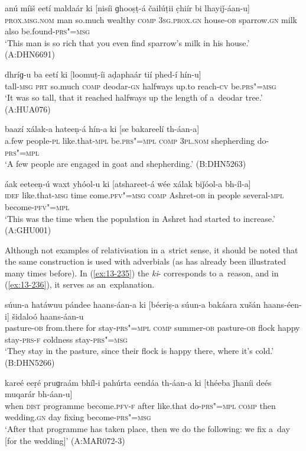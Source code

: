 \begin{exe}
\ex
\label{ex:13-231}
\gll anú míiš eetí maldaár ki [nisíi  ɡhooṣṭ-á čailúṭii c̣hiír bi lhayiǰ-áan-u] \\
\textsc{prox.msg.nom} man so.much wealthy \textsc{comp} \textsc{3sg.prox.gn }  house-\textsc{ob} sparrow.\textsc{gn} milk also be.found-\textsc{prs"=msg} \\
\glt `This man is so rich that you even find sparrow's milk in his house.' (A:DHN6691)

\ex
\label{ex:13-232}
\gll dhríɡ-u ba eetí ki [loomuṭ-íi aḍaphaár  tií phed-í hín-u] \\
tall-\textsc{msg} \textsc{prt} so.much \textsc{comp} deodar-\textsc{gn} halfways up.to reach-\textsc{cv} be.\textsc{prs"=msg} \\
\glt `It was so tall, that it reached halfways up the length of a~deodar tree.' (A:HUA076)

\ex
\label{ex:13-233}
\gll baazí xálak-a hateeṇ-á hín-a ki  [se bakareelí th-áan-a]  \\
a.few people-\textsc{pl}  like.that-\textsc{mpl} be.\textsc{prs"=mpl} \textsc{comp}  \textsc{3pl.nom}  shepherding do-\textsc{prs"=mpl} \\
\glt `A few people are engaged in goat and shepherding.' (B:DHN5263)

\ex
\label{ex:13-234}
\gll áak eeteeṇ-ú waxt yhóol-u ki  [atshareet-á wée xálak biǰóol-a bh-íl-a] \\
\textsc{idef} like.that-\textsc{msg} time come.\textsc{pfv"=msg} \textsc{comp} Ashret-\textsc{ob} in people several-\textsc{mpl} become-\textsc{pfv"=mpl} \\
\glt `This was the time when the population in Ashret had started to increase.' (A:GHU001) 
\end{exe}

Although not examples of relativisation in a~strict sense, it should be noted that the same construction is used with  adverbials (as has already been illustrated many times before). In (\ref{ex:13-235}) the \textit{ki}- corresponds to a~reason, and in (\ref{ex:13-236}), it serves as an~explanation.

\begin{exe}
\ex
\label{ex:13-235}
\gll súun-a hatáwuu pándee haans-áan-a ki  [béeriṣ-a súun-a bakáara
  xušán haans-éen-i]  šidaloó haans-áan-u \\
pasture-\textsc{ob} from.there for stay-\textsc{prs"=mpl} \textsc{comp}  summer-\textsc{ob} pasture-\textsc{ob} flock happy stay-\textsc{prs-f} coldness stay-\textsc{prs"=msg} \\
\glt `They stay in the pasture, since their flock is happy there, where it's cold.' (B:DHN5266)

\ex
\label{ex:13-236}
\gll kareé eeṛé pruɡraám bhíl-i pahúrta eendáa  th-áan-a ki [théeba
  ǰhaníi deés muqarár  bh-áan-u] \\
when \textsc{dist} programme become.\textsc{pfv-f} after like.that  do-\textsc{prs"=mpl} \textsc{comp} then wedding.\textsc{gn} day fixing become-\textsc{prs"=msg} \\
\glt `After that programme has taken place, then we do the following: we fix a~day [for the wedding]' (A:MAR072-3)
\end{exe}